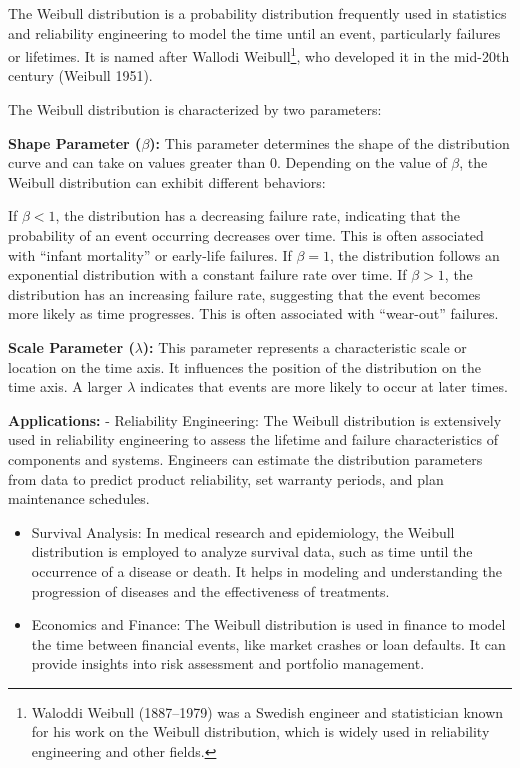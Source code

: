 \documentclass[
  a4paper,
]{scrbook}
\begin{document}
The Weibull distribution is a probability distribution frequently used
in statistics and reliability engineering to model the time until an
event, particularly failures or lifetimes. It is named after Wallodi
Weibull\footnote{Waloddi Weibull (1887--1979) was a Swedish engineer and
  statistician known for his work on the Weibull distribution, which is
  widely used in reliability engineering and other fields.}, who
developed it in the mid-20th century (Weibull 1951).

The Weibull distribution is characterized by two parameters:

\textbf{Shape Parameter (\(\beta\)):} This parameter determines the
shape of the distribution curve and can take on values greater than 0.
Depending on the value of \(\beta\), the Weibull distribution can
exhibit different behaviors:

If \(\beta < 1\), the distribution has a decreasing failure rate,
indicating that the probability of an event occurring decreases over
time. This is often associated with ``infant mortality'' or early-life
failures. If \(\beta = 1\), the distribution follows an exponential
distribution with a constant failure rate over time. If \(\beta > 1\),
the distribution has an increasing failure rate, suggesting that the
event becomes more likely as time progresses. This is often associated
with ``wear-out'' failures.

\textbf{Scale Parameter (\(\lambda\)):} This parameter represents a
characteristic scale or location on the time axis. It influences the
position of the distribution on the time axis. A larger \(\lambda\)
indicates that events are more likely to occur at later times.

\textbf{Applications:} - Reliability Engineering: The Weibull
distribution is extensively used in reliability engineering to assess
the lifetime and failure characteristics of components and systems.
Engineers can estimate the distribution parameters from data to predict
product reliability, set warranty periods, and plan maintenance
schedules.

\begin{itemize}
\item
  Survival Analysis: In medical research and epidemiology, the Weibull
  distribution is employed to analyze survival data, such as time until
  the occurrence of a disease or death. It helps in modeling and
  understanding the progression of diseases and the effectiveness of
  treatments.
\item
  Economics and Finance: The Weibull distribution is used in finance to
  model the time between financial events, like market crashes or loan
  defaults. It can provide insights into risk assessment and portfolio
  management.
\end{itemize}
\end{document}

